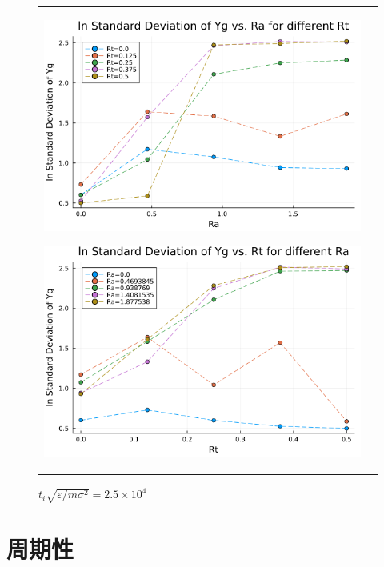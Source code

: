 \begin{figure}[H]
  \begin{tabular}{cc}
    \begin{minipage}[t]{0.5\hsize}
      \centering
      \includegraphics[width=\textwidth]{image/lnStdYg_Ra0.0to1.877538_Rt0.0to0.5_ti25000.png}
      \subcaption{}
      \label{}
    \end{minipage}
    \begin{minipage}[t]{0.5\hsize}
      \centering
      \includegraphics[width=\textwidth]{image/lnStdYg_Rt0.0to0.5_Ra0.0to1.877538_ti25000.png}
      \subcaption{}
      \label{}
    \end{minipage}
  \end{tabular}
  \caption{$t_i \sqrt{\varepsilon / m \sigma^2} = 2.5 \times 10^{4}$}
  \label{}
\end{figure}

\section{周期性}

